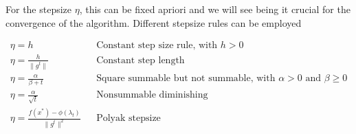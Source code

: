 \documentclass[notitlepage]{article}
\begin{document}
For the stepsize $\eta$, this can be fixed apriori and we will see being it crucial for the convergence of the algorithm. Different stepsize rules can be employed \cite{stepsizes}

\begin{align*}
  \eta = h && \text{Constant step size rule, with $h > 0$} \\
  \eta = \frac{h}{\| g^t \|} && \text{Constant step length} \\
  \eta = \frac{\alpha}{\beta + t} && \text{Square summable but not summable, with $\alpha > 0$ and $\beta \ge 0$} \\
  \eta = \frac{\alpha}{\sqrt{t}} && \text{Nonsummable diminishing} \\
  \eta = \frac{f(x^*) - \phi(\lambda_t)}{\|g^t\|^2} && \text{Polyak stepsize} 
\end{align*}
\end{document}
